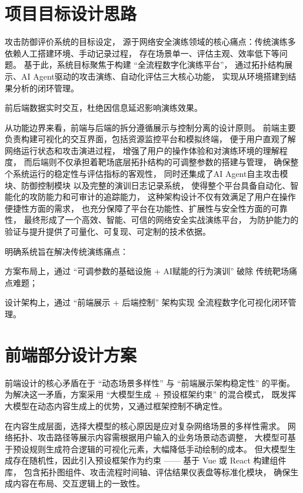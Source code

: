 \documentclass[lang=cn,10pt]{elegantbook}
\begin{document}
\section{项目目标设计思路}
攻击防御评价系统的目标设定，
源于网络安全演练领域的核心痛点：传统演练多依赖人工搭建环境、手动记录过程，
存在场景单一、评估主观、效率低下等问题。
基于此，系统目标聚焦于构建 “全流程数字化演练平台”，
通过拓扑结构展示、AI Agent驱动的攻击演练、自动化评估三大核心功能，
实现从环境搭建到结果分析的闭环管理。

\begin{theorem}
    前后端数据实时交互，杜绝因信息延迟影响演练效果。
\end{theorem}

从功能边界来看，前端与后端的拆分遵循展示与控制分离的设计原则。
前端主要负责构建可视化的交互界面，包括资源监控平台和模拟终端，
便于用户直观了解网络运行状态和攻击演进过程，
增强了用户的操作体验和对演练环境的理解程度，
而后端则不仅承担着靶场底层拓扑结构的可调整参数的搭建与管理，
确保整个系统运行的稳定性与评估指标的客观性，
同时还集成了AI Agent自主攻击模块、防御控制模块
以及完整的演训日志记录系统，
使得整个平台具备自动化、智能化的攻防能力和可审计的追踪能力，
这种架构设计不仅有效满足了用户在操作便捷性方面的需求，
也充分保障了平台在功能性、扩展性与安全性方面的可靠性，
最终形成了一个高效、智能、可信的网络安全实战演练平台，
为防护能力的验证与提升提供了可量化、可复现、可定制的技术依据。

\begin{definition}
    明确系统旨在解决传统演练痛点：

    方案布局上，通过 “可调参数的基础设施 + AI赋能的行为演训” 破除
    传统靶场痛点难题；

    设计架构上，通过 “前端展示 + 后端控制” 架构实现
    全流程数字化可视化闭环管理。
\end{definition}

\section{前端部分设计方案}
前端设计的核心矛盾在于 “动态场景多样性” 与 “前端展示架构稳定性” 的平衡。
为解决这一矛盾，方案采用 “大模型生成 + 预设框架约束” 的混合模式，
既发挥大模型在动态内容生成上的优势，又通过框架控制不确定性。


在内容生成层面，选择大模型的核心原因是应对复杂网络场景的多样性需求。
网络拓扑、攻击路径等展示内容需根据用户输入的业务场景动态调整，
大模型可基于预设规则生成符合逻辑的可视化元素，大幅降低手动绘制的成本。
但大模型生成存在随机性，因此引入预设框架作为约束 —— 基于 Vue 或 React 构建组件库，
包含拓扑图组件、攻击流程时间轴、评估结果仪表盘等标准化模块，
确保生成内容在布局、交互逻辑上的一致性。
\end{document}
